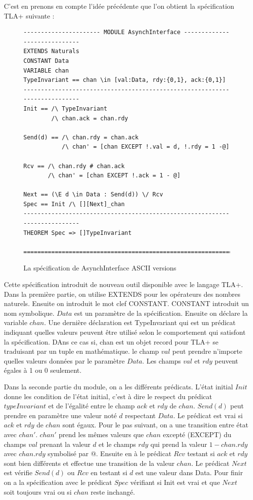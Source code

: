 \documentclass[12pt,a4paper]{article}
\begin{document}
C'est en prenons en compte l'idée précédente que l'on obtient la spécification TLA+ suivante :

\begin{figure}[ht]
\begin{lstlisting}[frame=single, basicstyle=\footnotesize]
---------------------- MODULE AsynchInterface -----------------------------
EXTENDS Naturals
CONSTANT Data
VARIABLE chan
TypeInvariant == chan \in [val:Data, rdy:{0,1}, ack:{0,1}]
---------------------------------------------------------------------------
Init == /\ TypeInvariant
        /\ chan.ack = chan.rdy
        
Send(d) == /\ chan.rdy = chan.ack
           /\ chan' = [chan EXCEPT !.val = d, !.rdy = 1 -@]
           
Rcv == /\ chan.rdy # chan.ack
       /\ chan' = [chan EXCEPT !.ack = 1 - @]

Next == (\E d \in Data : Send(d)) \/ Rcv
Spec == Init /\ [][Next]_chan
---------------------------------------------------------------------------
THEOREM Spec => []TypeInvariant       

===========================================================================
\end{lstlisting}
\caption{La spécification de AsynchInterface ASCII versions}
\end{figure}

Cette spécification introduit de nouveau outil disponible avec le langage TLA+. Dans la première partie, on utilise EXTENDS pour les opérateurs des nombres naturels. Ensuite on introduit le mot clef CONSTANT. CONSTANT introduit un nom symbolique. $Data$ est un paramètre de la spécification.
Ensuite on déclare la variable $chan$. Une dernière déclaration est TypeInvariant qui est un prédicat indiquant quelles valeurs peuvent être utilisé selon le comportement qui satisfont la spécification. DAns ce cas si, chan est un objet record pour TLA+ se traduisant par un tuple en mathématique. le champ $val$ peut prendre n'importe quelles valeurs données par le paramètre $Data$. Les champs $val$ et $rdy$ peuvent égales à 1 ou 0 seulement.

Dans la seconde partie du module, on a les différents prédicats. L'état initial $Init$ donne les condition de l'état initial, c'est à dire le respect du prédicat $typeInvariant$ et de l'égalité entre le champ $ack$ et $rdy$ de $chan$. $Send(d)$ peut prendre en paramètre une valeur noté $d$ respectant $Data$. Le prédicat est vrai si $ack$ et $rdy$ de $chan$ sont égaux. Pour le pas suivant, on a une transition entre état avec $chan'$. $chan'$ prend les mêmes valeurs que $chan$ excepté (EXCEPT) du champs $val$ prenant la valeur $d$ et le champs $rdy$ qui prend la valeur $1 - chan.rdy$ avec $chan.rdy$ symbolisé par @.
Ensuite en à le prédicat $Rcv$ testant si $ack$ et $rdy$ sont bien différents et effectue une transition de la valeur $chan$.
Le prédicat $Next$ est vérifie $Send(d)$ ou $Rcv$ en testant si $d$ est une valeur dans Data. Pour finir on a la spécification avec le prédicat $Spec$ vérifiant si Init est vrai et que $Next$ soit toujours vrai ou si $chan$ reste inchangé.
\end{document}
